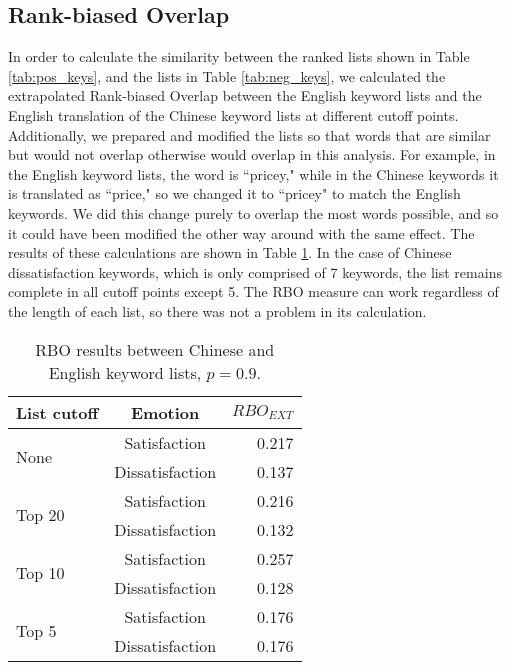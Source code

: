 \documentclass[smallextended,natbib]{svjour3}       %
\begin{document}
  \subsection{Rank-biased Overlap}\label{rboresults}

    In order to calculate the similarity between the ranked lists shown in Table \ref{tab:pos_keys}, and the lists in Table \ref{tab:neg_keys}, we calculated the extrapolated Rank-biased Overlap between the English keyword lists and the English translation of the Chinese keyword lists at different cutoff points. Additionally, we prepared and modified the lists so that words that are similar but would not overlap otherwise would overlap in this analysis. For example, in the English keyword lists, the word is ``pricey," while in the Chinese keywords it is translated as ``price," so we changed it to ``pricey" to match the English keywords. We did this change purely to overlap the most words possible, and so it could have been modified the other way around with the same effect. The results of these calculations are shown in Table \ref{tab:rbo}. In the case of Chinese dissatisfaction keywords, which is only comprised of 7 keywords, the list remains complete in all cutoff points except 5. The RBO measure can work regardless of the length of each list, so there was not a problem in its calculation.

    \begin{table}[h]
    \centering
    \caption{RBO results between Chinese and English keyword lists, \(p=0.9\).}
    \label{tab:rbo}
    \begin{tabular}{|l|c|r|}
    \hline
    \multicolumn{1}{|c|}{\textbf{List cutoff}} & \textbf{Emotion} & \(RBO_{EXT}\) \\ \hline
    \multirow{2}{*}{None}   & Satisfaction      & 0.217 \\ \cline{2-3} 
                            & Dissatisfaction   & 0.137 \\ \hline
    \multirow{2}{*}{Top 20} & Satisfaction      & 0.216 \\ \cline{2-3} 
                            & Dissatisfaction   & 0.132 \\ \hline
    \multirow{2}{*}{Top 10} & Satisfaction      & 0.257 \\ \cline{2-3} 
                            & Dissatisfaction   & 0.128 \\ \hline
    \multirow{2}{*}{Top 5}  & Satisfaction      & 0.176 \\ \cline{2-3} 
                            & Dissatisfaction   & 0.176 \\ \hline
    \end{tabular}
    \end{table}
\end{document}
